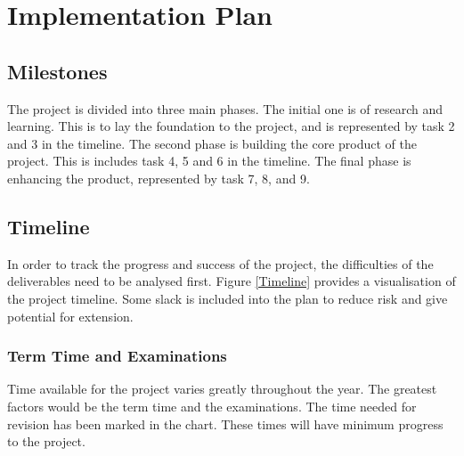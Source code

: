 \section{Implementation Plan}


\subsection{Milestones}
The project is divided into three main phases.
The initial one is of research and learning.
This is to lay the foundation to the project, and is represented by task 2 and 3
in the timeline.
The second phase is building the core product of the project.
This is includes task 4, 5 and 6 in the timeline.
The final phase is enhancing the product, represented by task 7, 8, and 9.

\subsection{Timeline}
\begin{figure*}
  \centering
  
  \caption{Project Timeline}
  \label{Timeline}
\end{figure*}

In order to track the progress and success of the project, the difficulties
of the deliverables need to be analysed first.
Figure \ref{Timeline} provides a visualisation of the project timeline.
Some slack is included into the plan to reduce risk and give potential for
extension.


\subsubsection{\textbf{Term Time and Examinations}}
Time available for the project varies greatly throughout the year.
The greatest factors would be the term time and the examinations.
The time needed for revision has been marked in the chart.
These times will have minimum progress to the project.

